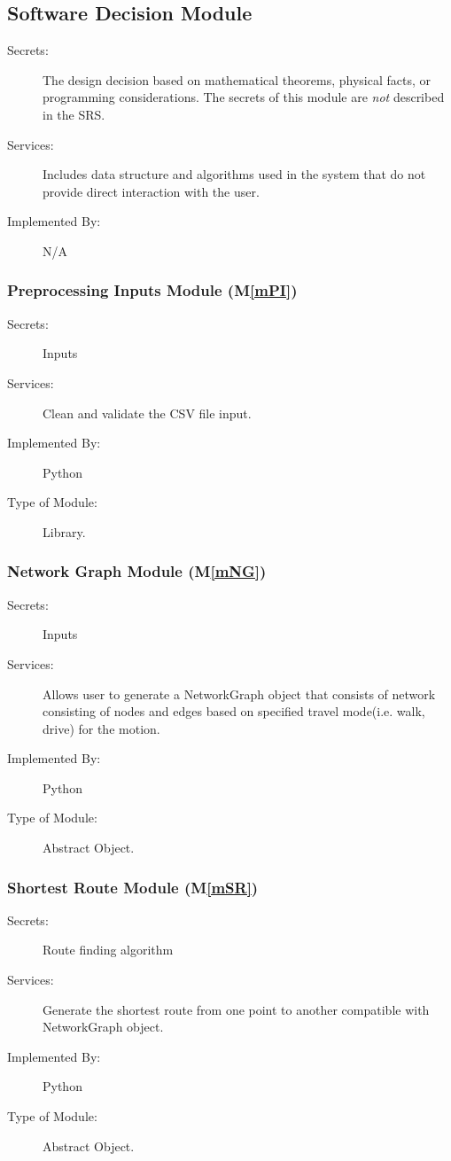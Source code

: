 \documentclass[12pt, titlepage]{article}
\newcommand{\mref}[1]{M\ref{#1}}
\begin{document}
\subsection{Software Decision Module}

\begin{description}
\item[Secrets:] The design decision based on mathematical theorems, physical
  facts, or programming considerations. The secrets of this module are
  \emph{not} described in the SRS.
\item[Services:] Includes data structure and algorithms used in the system that
  do not provide direct interaction with the user. 
\item[Implemented By:] N/A
\end{description}

\subsubsection{Preprocessing Inputs Module (\mref{mPI})}
\begin{description}
\item[Secrets:] Inputs
\item[Services:]Clean and validate the CSV file input.
\item[Implemented By:] Python
\item[Type of Module:] Library. 
\end{description}

\subsubsection{Network Graph Module (\mref{mNG})}
\begin{description}
\item[Secrets:]Inputs
\item[Services:]Allows user to generate a NetworkGraph object that consists of network consisting of nodes and edges based on specified travel mode(i.e. walk, drive) for the motion. 
\item[Implemented By:] Python
\item[Type of Module:] Abstract Object.
\end{description}

\subsubsection{Shortest Route Module (\mref{mSR})}
\begin{description}
\item[Secrets:]Route finding algorithm
\item[Services:]Generate the shortest route from one point to another compatible with NetworkGraph object.
\item[Implemented By:] Python
\item[Type of Module:] Abstract Object. 
\end{description}
\end{document}
